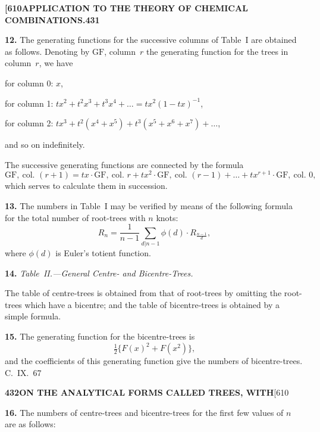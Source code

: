 \documentclass[11pt,a4paper]{article}
\begin{document}
{\newpage
\noindent\textbf{[610}\hspace{\fill}\textbf{APPLICATION TO THE THEORY OF CHEMICAL COMBINATIONS.}\hspace{\fill}\textbf{431}

\noindent\textbf{12.}
The generating functions for the successive columns of Table~I are obtained as follows. Denoting by $\mathrm{GF}$, column~$r$ the generating function for the trees in column~$r$, we have

for column 0: $x$,

for column 1: $tx^2 + t^2x^3 + t^3x^4 + \ldots = tx^2(1-tx)^{-1}$,

for column 2: $tx^3 + t^2(x^4+x^5) + t^3(x^5+x^6+x^7) + \ldots$,

and so on indefinitely.

The successive generating functions are connected by the formula
\[
\mathrm{GF},\ \text{col. }(r+1) = tx \cdot \mathrm{GF},\ \text{col. }r + tx^2 \cdot \mathrm{GF},\ \text{col. }(r-1) + \ldots + tx^{r+1} \cdot \mathrm{GF},\ \text{col. }0,
\]
which serves to calculate them in succession.

\medskip
\noindent\textbf{13.}
The numbers in Table~I may be verified by means of the following formula for the total number of root-trees with $n$ knots:
\[
R_n = \frac{1}{n-1} \sum_{d|n-1} \phi(d) \cdot R_{\frac{n-1}{d}},
\]
where $\phi(d)$ is Euler's totient function.

\medskip
\noindent\textbf{14.}
\textit{Table~II.---General Centre- and Bicentre-Trees.}

The table of centre-trees is obtained from that of root-trees by omitting the root-trees which have a bicentre; and the table of bicentre-trees is obtained by a simple formula.

\medskip
\noindent\textbf{15.}
The generating function for the bicentre-trees is
\[
\tfrac{1}{2}\{F(x)^2 + F(x^2)\},
\]
and the coefficients of this generating function give the numbers of bicentre-trees.
\hfill C.~IX.\ 67

\newpage
\noindent\textbf{432}\hspace{\fill}\textbf{ON THE ANALYTICAL FORMS CALLED TREES, WITH}\hspace{\fill}[610

\noindent\textbf{16.}
The numbers of centre-trees and bicentre-trees for the first few values of $n$ are as follows:

}
\end{document}
